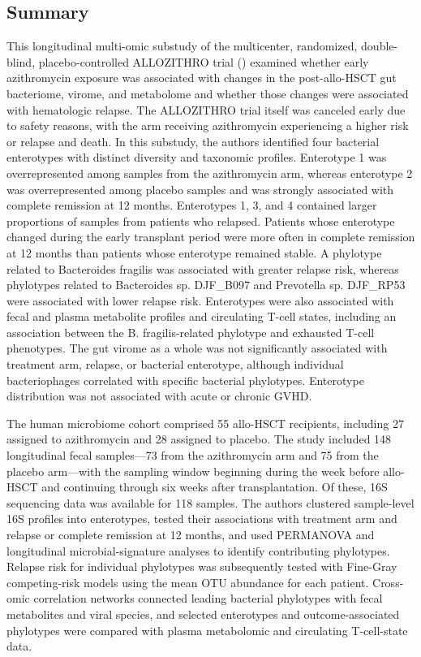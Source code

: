 \documentclass[11pt,a4paper]{article}
\begin{document}
\subsection{Summary}
This longitudinal multi-omic substudy of the multicenter, randomized, double-blind, placebo-controlled ALLOZITHRO trial (\cite{Bergeron2017}) examined whether early azithromycin exposure was associated with changes in the post-allo-HSCT gut bacteriome, virome, and metabolome and whether those changes were associated with hematologic relapse. The ALLOZITHRO trial itself was canceled early due to safety reasons, with the arm receiving azithromycin experiencing a higher risk or relapse and death. In this substudy, the authors identified four bacterial enterotypes with distinct diversity and taxonomic profiles. Enterotype 1 was overrepresented among samples from the azithromycin arm, whereas enterotype 2 was overrepresented among placebo samples and was strongly associated with complete remission at 12 months. Enterotypes 1, 3, and 4 contained larger proportions of samples from patients who relapsed. Patients whose enterotype changed during the early transplant period were more often in complete remission at 12 months than patients whose enterotype remained stable. A phylotype related to Bacteroides fragilis was associated with greater relapse risk, whereas phylotypes related to Bacteroides sp. DJF\_B097 and Prevotella sp. DJF\_RP53 were associated with lower relapse risk. Enterotypes were also associated with fecal and plasma metabolite profiles and circulating T-cell states, including an association between the B. fragilis-related phylotype and exhausted T-cell phenotypes. The gut virome as a whole was not significantly associated with treatment arm, relapse, or bacterial enterotype, although individual bacteriophages correlated with specific bacterial phylotypes. Enterotype distribution was not associated with acute or chronic GVHD.

The human microbiome cohort comprised 55 allo-HSCT recipients, including 27 assigned to azithromycin and 28 assigned to placebo. The study included 148 longitudinal fecal samples—73 from the azithromycin arm and 75 from the placebo arm—with the sampling window beginning during the week before allo-HSCT and continuing through six weeks after transplantation. Of these, 16S sequencing data was available for 118 samples. The authors clustered sample-level 16S profiles into enterotypes, tested their associations with treatment arm and relapse or complete remission at 12 months, and used PERMANOVA and longitudinal microbial-signature analyses to identify contributing phylotypes. Relapse risk for individual phylotypes was subsequently tested with Fine-Gray competing-risk models using the mean OTU abundance for each patient. Cross-omic correlation networks connected leading bacterial phylotypes with fecal metabolites and viral species, and selected enterotypes and outcome-associated phylotypes were compared with plasma metabolomic and circulating T-cell-state data.
\end{document}
